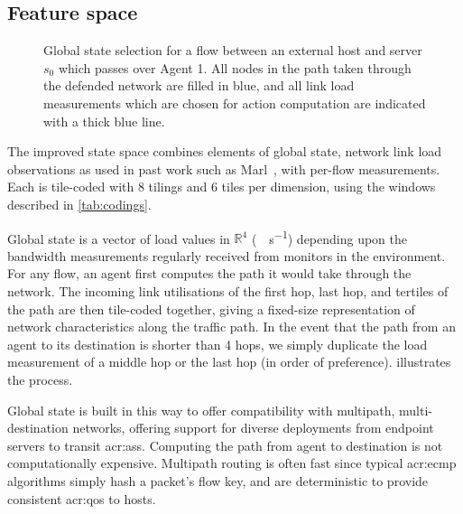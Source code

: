 \subsection{Feature space}\label{sec:feature-space}

\begin{figure}
	\centering
	\resizebox{0.9\linewidth}{!}{
		
	}
	\caption[Global state selection for a flow across a monitored AS.]{
		Global state selection for a flow between an external host and server $s_0$ which passes over Agent 1.
		All nodes in the path taken through the defended network are filled in blue, and all link load measurements which are chosen for action computation are indicated with a thick blue line.
		\label{fig:global-state-path}
	}
\end{figure}

The improved state space combines elements of global state, network link load observations as used in past work such as Marl~\parencite{DBLP:journals/eaai/MalialisK15}, with per-flow measurements.
Each is tile-coded with \num{8} tilings and \num{6} tiles per dimension, using the windows described in \cref{tab:codings}.

Global state is a vector of load values in $\mathbb{R}^4$ (\unit{\mega\bit\per\second}) depending upon the bandwidth measurements regularly received from monitors in the environment.
For any flow, an agent first computes the path it would take through the network.
The incoming link utilisations of the first hop, last hop, and tertiles of the path are then tile-coded together, giving a fixed-size representation of network characteristics along the traffic path.
In the event that the path from an agent to its destination is shorter than \num{4} hops, we simply duplicate the load measurement of a middle hop or the last hop (in order of preference).
 illustrates the process.

Global state is built in this way to offer compatibility with multipath, multi-destination networks, offering support for diverse deployments from endpoint servers to transit \glspl{acr:as}.
Computing the path from agent to destination is not computationally expensive.
Multipath routing is often fast since typical \gls{acr:ecmp} algorithms simply hash a packet's flow key, and are deterministic to provide consistent \gls{acr:qos} to hosts.

